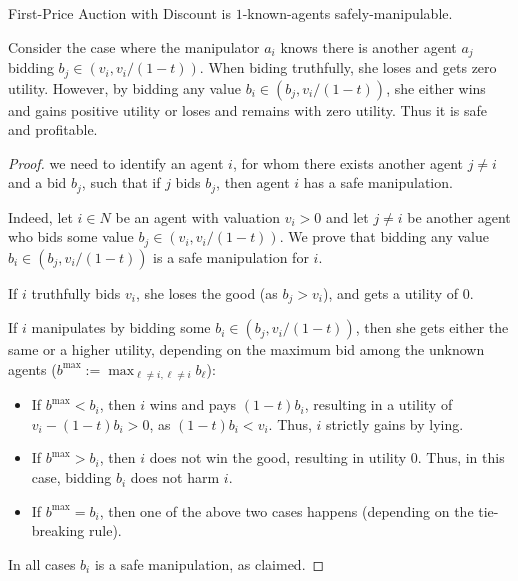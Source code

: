\begin{lemmarep}
    First-Price Auction with Discount is $1$-known-agents safely-manipulable. 
\end{lemmarep}
\begin{proofsketch}
    Consider the case where the manipulator $a_i$ knows there is another agent $a_j$ bidding $b_j \in (v_i, v_i/(1-t))$.
    When biding truthfully, she loses and gets zero utility. 
    However, by bidding any value $b_i\in (b_j, v_i/(1-t))$, she either wins and gains positive utility or loses and remains with zero utility. Thus it is safe and profitable. 
\end{proofsketch}
\begin{proof}
we need to identify an agent $i$, for whom there exists another agent $j \neq i$ and a bid $b_j$, such that if $j$ bids $b_j$, then agent $i$ has a safe manipulation.

Indeed, let $i \in N$ be an agent with valuation $v_i >0$ and let $j \neq i$ be another agent who bids some value  $b_j \in (v_i, v_i/(1-t))$. 
We prove that bidding any value $b_i\in (b_j, v_i/(1-t))$ is a safe manipulation for $i$.

If $i$ truthfully bids $v_i$, she loses the good (as $b_j > v_i$), and gets a utility of $0$.

If $i$ manipulates by bidding some $b_i\in (b_j, v_i/(1-t))$, then she gets either the same or a higher utility, depending on the maximum bid among the unknown agents ($b^{\max} := \displaystyle \max_{\ell\neq i, \ell\neq i}b_{\ell}$):
    \begin{itemize}
        \item If $b^{\max} < b_i$, then $i$ wins and pays $(1-t)b_i$, resulting in a utility of $v_i - (1-t)b_i > 0$, as $(1-t)b_i < v_i$. Thus, $i$ strictly gains by lying.

        \item  If $b^{\max} > b_i$, then $i$ does not win the good, resulting in utility $0$. Thus, in this case, bidding $b_i$ does not harm $i$.
        
        \item If $b^{\max} = b_i$, then one of the above two cases happens (depending on the tie-breaking rule).
    \end{itemize}
In all cases $b_i$ is a safe manipulation, as claimed.
\end{proof}



